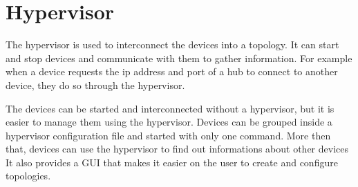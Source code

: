 \section{Hypervisor}
\label{sub-sec:hypervisor}

The hypervisor is used to interconnect the devices into a topology. It can start and stop devices and 
communicate with them to gather information. For example when a device requests the ip address and port
of a hub to connect to another device, they do so through the hypervisor.

The devices can be started and interconnected without a hypervisor, but it is easier to manage them
using the hypervisor. Devices can be grouped inside a hypervisor configuration file and started with
only one command. More then that, devices can use the hypervisor to find out informations about other devices
It also provides a GUI that makes it easier on the user to create and configure topologies.

